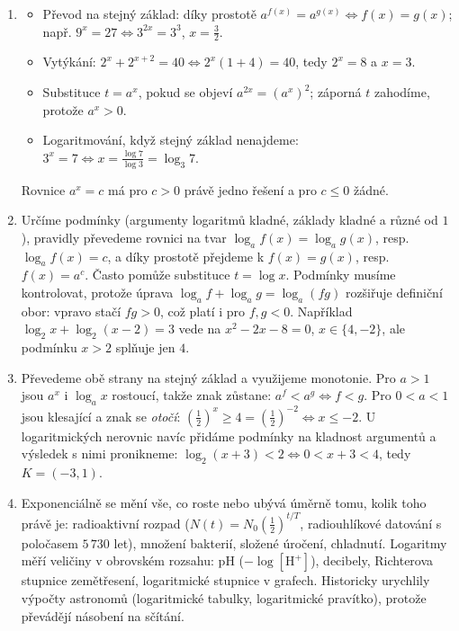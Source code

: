 \begin{enumerate}[label=\textbf{\arabic*.}, leftmargin=*, itemsep=0.8em]
  \item {}
  \begin{itemize}
    \item Převod na stejný základ: díky prostotě $a^{f(x)} = a^{g(x)}\Leftrightarrow f(x) = g(x)$; např. $9^x = 27 \Leftrightarrow 3^{2x} = 3^3$, $x = \frac{3}{2}$.
    \item Vytýkání: $2^x + 2^{x + 2} = 40 \Leftrightarrow 2^x(1 + 4) = 40$, tedy $2^x = 8$ a $x = 3$.
    \item Substituce $t = a^x$, pokud se objeví $a^{2x} = {(a^x)}^2$; záporná $t$ zahodíme, protože $a^x > 0$.
    \item Logaritmování, když stejný základ nenajdeme: $3^x = 7 \Leftrightarrow x = \frac{\log 7}{\log 3} = \log_3 7$.
  \end{itemize}
  Rovnice $a^x = c$ má pro $c > 0$ právě jedno řešení a pro $c\leq 0$ žádné. 

  \item {}
  Určíme podmínky (argumenty logaritmů kladné, základy kladné a různé od $1$), pravidly převedeme rovnici na tvar $\log_a f(x) = \log_a g(x)$, resp. $\log_a f(x) = c$, a díky prostotě přejdeme k $f(x) = g(x)$, resp. $f(x) = a^c$. Často pomůže substituce $t = \log x$. Podmínky musíme kontrolovat, protože úprava $\log_a f + \log_a g = \log_a(fg)$ rozšiřuje definiční obor: vpravo stačí $fg > 0$, což platí i pro $f, g < 0$. Například $\log_2 x + \log_2(x - 2) = 3$ vede na $x^2 - 2x - 8 = 0$, $x\in\{4, -2\}$, ale podmínku $x > 2$ splňuje jen $4$. 

  \item {}
  Převedeme obě strany na stejný základ a využijeme monotonie. Pro $a > 1$ jsou $a^x$ i $\log_a x$ rostoucí, takže znak zůstane: $a^{f} < a^{g}\Leftrightarrow f < g$. Pro $0 < a < 1$ jsou klesající a znak se \emph{otočí}: ${\left(\frac{1}{2}\right)}^x\geq 4 = {\left(\frac{1}{2}\right)}^{-2}\Leftrightarrow x\leq -2$. U logaritmických nerovnic navíc přidáme podmínky na kladnost argumentů a výsledek s nimi pronikneme: $\log_2(x + 3) < 2 \Leftrightarrow 0 < x + 3 < 4$, tedy $K = (-3, 1)$. 

  \item {}
  Exponenciálně se mění vše, co roste nebo ubývá úměrně tomu, kolik toho právě je: radioaktivní rozpad ($N(t) = N_0{\left(\frac{1}{2}\right)}^{t/T}$, radiouhlíkové datování s poločasem $5\,730$ let), množení bakterií, složené úročení, chladnutí. Logaritmy měří veličiny v obrovském rozsahu: pH ($-\log[\mathrm{H}^+]$), decibely, Richterova stupnice zemětřesení, logaritmické stupnice v grafech. Historicky urychlily výpočty astronomů (logaritmické tabulky, logaritmické pravítko), protože převádějí násobení na sčítání. 
\end{enumerate}

